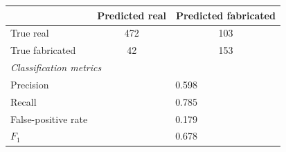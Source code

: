\begin{tabular}{lcc}
\toprule
                            & Predicted real & Predicted fabricated \\
\midrule
True real                   & 472        & 103              \\
True fabricated             & 42        & 153              \\
\midrule
\multicolumn{3}{l}{\textit{Classification metrics}} \\
\midrule
Precision                   & \multicolumn{2}{c}{0.598} \\
Recall                      & \multicolumn{2}{c}{0.785} \\
False-positive rate         & \multicolumn{2}{c}{0.179} \\
$F_1$                       & \multicolumn{2}{c}{0.678} \\
\bottomrule
\end{tabular}
